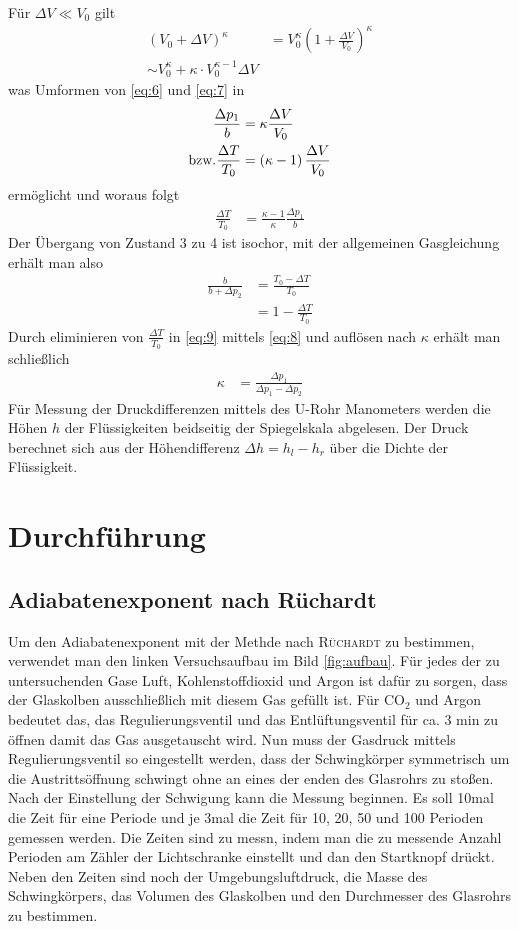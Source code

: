 \documentclass[12pt, a4paper, twoside]{scrartcl}
\newcommand{\person}[1]{\textsc{#1}}
\begin{document}
Für $\Delta V \ll V_0$ gilt
\begin{align*}
\left(V_0 + \Delta V\right)^{\kappa} &= V_0^{\kappa}\left(1+ \frac{\Delta V}{V_0}\right)^{\kappa} \\
\sim V_0^{\kappa} + \kappa \cdot V_0^{\kappa -1}\Delta V
\end{align*}
was Umformen von \ref{eq:6} und \ref{eq:7} in 
\begin{align*}
\frac{\Delta p_1}{b} &= \kappa \frac{\Delta V}{V_0} \\
\textnormal{bzw.}
\frac{\Delta T}{T_0} &= \left(\kappa -1 \right) \frac{\Delta V}{V_0}
\end{align*}
ermöglicht und woraus folgt
\begin{align}
\label{eq:8}
\frac{\Delta T}{T_0} &= \frac{\kappa -1}{\kappa} \frac{\Delta p_1}{b}
\end{align}
Der Übergang von Zustand 3 zu 4 ist isochor, mit der allgemeinen Gasgleichung erhält man also
\begin{align}
\label{eq:9}
\frac{b}{b +\Delta p_2} &= \frac{T_0 -\Delta T}{T_0} \\
&= 1- \frac{\Delta T}{T_0}
\end{align}
Durch eliminieren von $\frac{\Delta T}{T_0}$ in \ref{eq:9} mittels \ref{eq:8} und auflösen nach $\kappa$ erhält man schließlich
\begin{align*}
\kappa &= \frac{\Delta p_1}{\Delta p_1 - \Delta p_2}
\end{align*} 
Für Messung der Druckdifferenzen mittels des U-Rohr Manometers werden die Höhen $h$ der Flüssigkeiten beidseitig der Spiegelskala abgelesen. Der Druck berechnet sich aus der Höhendifferenz $\Delta h = h_l - h_r$ über die Dichte der Flüssigkeit.


\section{Durchführung}
\label{sec:durchfuehrung}
\subsection{Adiabatenexponent nach Rüchardt}
Um den Adiabatenexponent mit der Methde nach \person{Rüchardt} zu bestimmen, verwendet man den linken Versuchsaufbau im Bild \ref{fig:aufbau}.
Für jedes der zu untersuchenden Gase Luft, Kohlenstoffdioxid und Argon ist dafür zu sorgen, dass der Glaskolben ausschließlich mit diesem Gas gefüllt ist.
Für CO$_2$ und Argon bedeutet das, das Regulierungsventil und das Entlüftungsventil für ca. 3 min zu öffnen damit das Gas ausgetauscht wird.
Nun muss der Gasdruck mittels Regulierungsventil so eingestellt werden, dass der Schwingkörper symmetrisch um die Austrittsöffnung schwingt ohne an eines der enden des Glasrohrs zu stoßen.\\
Nach der Einstellung der Schwigung kann die Messung beginnen. Es soll 10mal die Zeit für eine Periode und je 3mal die Zeit für 10, 20, 50 und 100 Perioden gemessen werden.
Die Zeiten sind zu messn, indem man die zu messende Anzahl Perioden am Zähler der Lichtschranke einstellt und dan den Startknopf drückt.\\
Neben den Zeiten sind noch der Umgebungsluftdruck, die Masse des Schwingkörpers, das Volumen des Glaskolben und den Durchmesser des Glasrohrs zu bestimmen.
\end{document}
